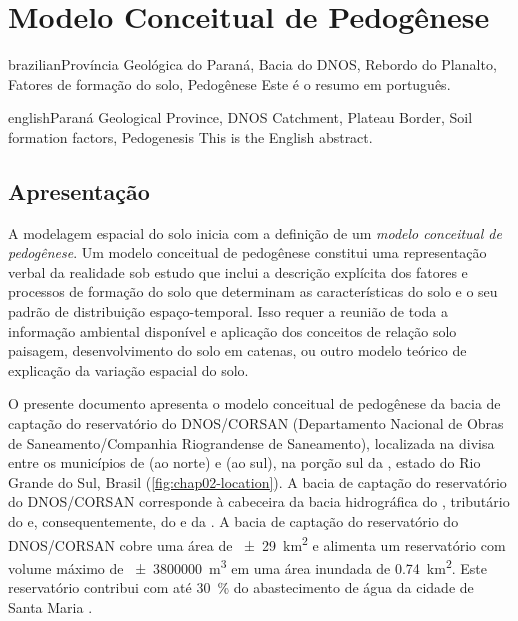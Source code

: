 \artigotrue
\chapter{Modelo Conceitual de Pedogênese}
\label{chap:chap02}


\def\ptkeys{Província Geológica do Paraná, Bacia do DNOS, Rebordo do Planalto, Fatores de formação do solo, 
Pedogênese}
\begin{chapterabstract}{brazilian}{\ptkeys}
 Este é o resumo em português.
\end{chapterabstract}

\def\enkeys{Paraná Geological Province, DNOS Catchment, Plateau Border, Soil formation factors, Pedogenesis}
  
\begin{chapterabstract}{english}{\enkeys}
 This is the English abstract.
\end{chapterabstract}

\formatchapter

\section{Apresentação}
\label{sec:chap02-apresentacao}


A modelagem espacial do solo inicia com a definição de um \emph{modelo conceitual de pedogênese}. Um modelo 
conceitual de pedogênese constitui uma representação verbal da realidade sob estudo que inclui a descrição 
explícita dos fatores e processos de formação do solo que determinam as características do solo e o seu padrão 
de distribuição espaço-temporal. Isso requer a reunião de toda a informação ambiental disponível e aplicação 
dos conceitos de relação solo paisagem, desenvolvimento do solo em catenas, ou outro modelo teórico de 
explicação da variação espacial do solo.

O presente documento apresenta o modelo conceitual de pedogênese da bacia de captação do reservatório do 
DNOS/CORSAN (Departamento Nacional de Obras de Saneamento/Companhia Riograndense de Saneamento), localizada na 
divisa entre os municípios de \itaara{} (ao norte) e \santamaria{} (ao sul), na porção sul da \baciaparana{},
estado do Rio Grande do Sul, Brasil (\autoref{fig:chap02-location}). A bacia de captação do reservatório do 
DNOS/CORSAN corresponde à cabeceira da bacia hidrográfica do \riovacacaimirim{}, tributário do \riojacui{} e, 
consequentemente, do \rioguaiba{} e da \lagoadospatos{}. A bacia de captação do reservatório do DNOS/CORSAN
cobre uma área de \SI{\pm29}{\square\kilo\metre} e alimenta um reservatório com volume máximo 
de \SI{\pm3800000}{\cubic\metre} em uma área inundada de \SI{0,74}{\square\kilo\metre}. Este reservatório 
contribui com até \SI{30}{\percent} do abastecimento de água da cidade de Santa Maria \cite{Dias2003, 
DillEtAl2004, Miguel2010}.

